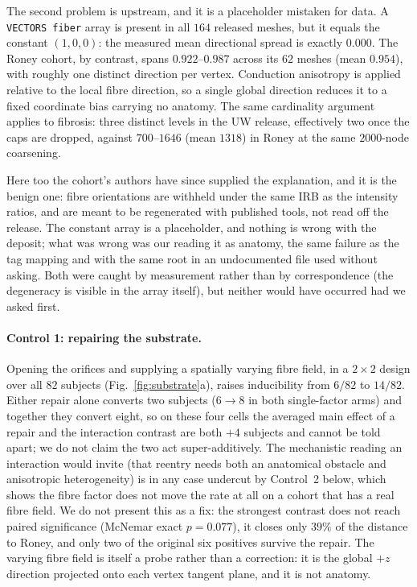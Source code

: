 \documentclass[11pt]{article}
\theoremstyle{definition}
\newcommand{\code}[1]{\texttt{#1}}
\begin{document}
The second problem is upstream, and it is a placeholder mistaken for data. A
\code{VECTORS fiber} array is present in all
$164$ released meshes, but it equals the constant $(1,0,0)$: the measured mean
directional spread is exactly $0.000$. The Roney cohort, by contrast, spans
$0.922$--$0.987$ across its $62$ meshes (mean $0.954$), with roughly one
distinct direction per vertex. Conduction anisotropy is applied relative to the
local fibre direction, so a single global direction reduces it to a fixed
coordinate bias carrying no anatomy. The same cardinality argument applies to
fibrosis: three distinct levels in the UW release, effectively two once the caps
are dropped, against $700$--$1646$ (mean $1318$) in Roney at the same
$2000$-node coarsening.

Here too the cohort's authors have since supplied the explanation, and it is the
benign one: fibre orientations are withheld under the same IRB as the intensity
ratios, and are meant to be regenerated with published tools, not read off the
release. The constant array is a placeholder, and nothing is wrong with the
deposit; what was wrong was our reading it as anatomy, the same failure as the
tag mapping and with the same root in an undocumented file used without asking.
Both were caught by measurement rather than by correspondence (the degeneracy is
visible in the array itself), but neither would have occurred had we asked
first.

\paragraph{Control 1: repairing the substrate.} Opening the orifices and
supplying a spatially varying fibre field, in a $2\times2$ design over all $82$
subjects (Fig.~\ref{fig:substrate}a), raises inducibility from $6/82$ to
$14/82$. Either repair alone converts two subjects ($6\to8$ in both single-factor arms)
and together they convert eight, so on these four cells the averaged main effect
of a repair and the interaction contrast are both $+4$ subjects and cannot be
told apart; we do not claim the two act super-additively. The mechanistic reading
an interaction would invite (that reentry needs both an anatomical obstacle and
anisotropic heterogeneity) is in any case undercut by Control~2 below, which
shows the fibre factor does not move the rate at all on a cohort that has a real
fibre field. We do not present this as a fix: the strongest contrast does not
reach paired significance (McNemar exact $p=0.077$), it closes only $39\%$ of
the distance to Roney, and only two of the original six positives survive the
repair. The varying fibre field is itself a probe rather than a correction: it
is the global $+z$ direction projected onto each vertex tangent plane, and it is
not anatomy.
\end{document}
